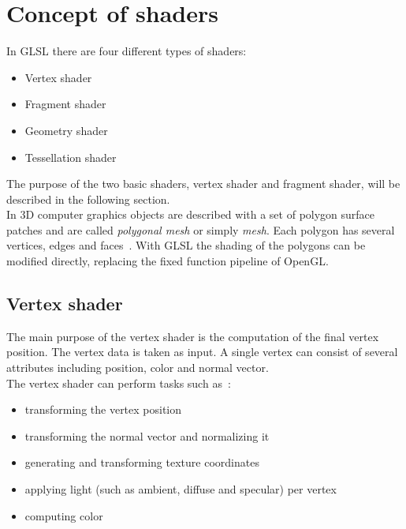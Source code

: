 \section{Concept of shaders}

In GLSL there are four different types of shaders:
\begin{itemize}
	\item Vertex shader
	\item Fragment shader
	\item Geometry shader
	\item Tessellation shader
\end{itemize}

The purpose of the two basic shaders, vertex shader and fragment shader, will be described in the following section.\\
\newline
In 3D computer graphics objects are described with a set of polygon surface patches and are called \emph{polygonal mesh} or simply \emph{mesh}. Each polygon has several vertices, edges and faces~\cite{book:computerGraphicsHearn}. With GLSL the shading of the polygons can be modified directly, replacing the fixed function pipeline of OpenGL.

\subsection{Vertex shader}
The main purpose of the vertex shader is the computation of the final vertex position. The vertex data is taken as input. A single vertex can consist of several attributes including position, color and normal vector.\\
The vertex shader can perform tasks such as~\cite{book:computerGraphicsHill}: %
\begin{itemize}
	\item transforming the vertex position
	\item transforming the normal vector and normalizing it
	\item generating and transforming texture coordinates
	\item applying light (such as ambient, diffuse and specular) per vertex
	\item computing color
\end{itemize}

